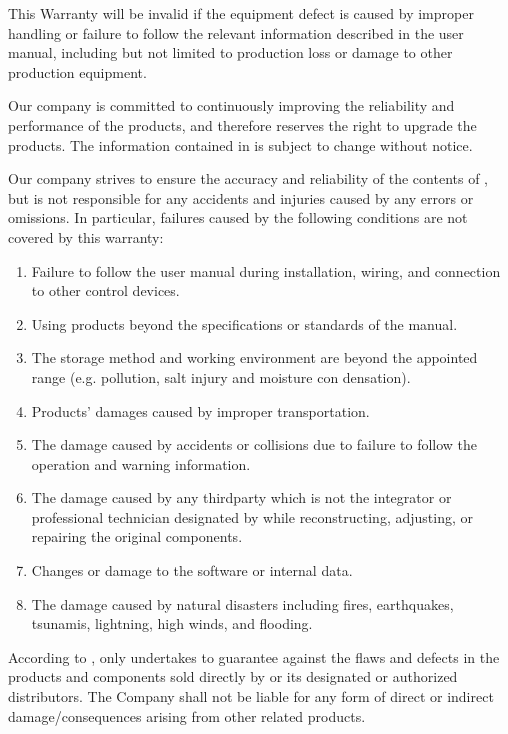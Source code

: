 This Warranty will be invalid if the equipment defect is caused by improper handling or failure to follow the relevant information described in the user manual, including but not limited to production loss or damage to other production equipment. 

Our company is committed to continuously improving the reliability and performance of the products, and therefore reserves the right to upgrade the products. The information contained in {\ThisBook} is subject to change without notice. 

Our company strives to ensure the accuracy and reliability of the contents of {\ThisBook}, but is not responsible for any accidents and injuries caused by any errors or omissions. In particular, failures caused by the following conditions are not covered by this warranty:


\begin{enumerate}
    \item Failure to follow the user manual during installation, wiring, and connection to other control devices. 
    \item Using products beyond the specifications or standards of the manual.
    \item The storage method and working environment are beyond the appointed range (e.g. pollution, salt injury and moisture con­ densation).
    \item Products' damages caused by improper transportation.
    \item The damage caused by accidents or collisions due to failure to follow the operation and warning information.
    \item The damage caused by any third­party which is not the integrator or professional technician designated by {\TheCompany} while reconstructing, adjusting, or repairing the original components. 
    \item Changes or damage to the software or internal data.
    \item The damage caused by natural disasters including fires, earthquakes, tsunamis, lightning, high winds, and flooding.

\end{enumerate}

According to , {\TheCompany} only undertakes to guarantee against the flaws and defects in the products and components sold directly by {\TheCompany} or its designated or authorized distributors.
The Company shall not be liable for any form of direct or indirect damage/consequences arising from other related products.